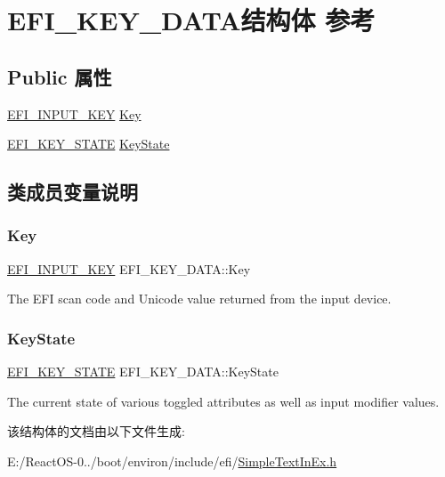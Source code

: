 \hypertarget{struct_e_f_i___k_e_y___d_a_t_a}{}\section{E\+F\+I\+\_\+\+K\+E\+Y\+\_\+\+D\+A\+T\+A结构体 参考}
\label{struct_e_f_i___k_e_y___d_a_t_a}
\subsection*{Public 属性}
\begin{DoxyCompactItemize}
\item 
\hyperlink{struct_e_f_i___i_n_p_u_t___k_e_y}{E\+F\+I\+\_\+\+I\+N\+P\+U\+T\+\_\+\+K\+EY} \hyperlink{struct_e_f_i___k_e_y___d_a_t_a_a820292c57a8737fe2cbae05d847d3657}{Key}
\item 
\hyperlink{struct___e_f_i___k_e_y___s_t_a_t_e}{E\+F\+I\+\_\+\+K\+E\+Y\+\_\+\+S\+T\+A\+TE} \hyperlink{struct_e_f_i___k_e_y___d_a_t_a_ad3c7e272c50ae718fa27bab09ec7b96f}{Key\+State}
\end{DoxyCompactItemize}


\subsection{类成员变量说明}
\mbox{\label{struct_e_f_i___k_e_y___d_a_t_a_a820292c57a8737fe2cbae05d847d3657}} 
\subsubsection{\texorpdfstring{Key}{Key}}
{\footnotesize\ttfamily \hyperlink{struct_e_f_i___i_n_p_u_t___k_e_y}{E\+F\+I\+\_\+\+I\+N\+P\+U\+T\+\_\+\+K\+EY} E\+F\+I\+\_\+\+K\+E\+Y\+\_\+\+D\+A\+T\+A\+::\+Key}

The E\+FI scan code and Unicode value returned from the input device. \mbox{\label{struct_e_f_i___k_e_y___d_a_t_a_ad3c7e272c50ae718fa27bab09ec7b96f}} 
\subsubsection{\texorpdfstring{Key\+State}{KeyState}}
{\footnotesize\ttfamily \hyperlink{struct___e_f_i___k_e_y___s_t_a_t_e}{E\+F\+I\+\_\+\+K\+E\+Y\+\_\+\+S\+T\+A\+TE} E\+F\+I\+\_\+\+K\+E\+Y\+\_\+\+D\+A\+T\+A\+::\+Key\+State}

The current state of various toggled attributes as well as input modifier values. 

该结构体的文档由以下文件生成\+:\begin{DoxyCompactItemize}
\item 
E\+:/\+React\+O\+S-\/0../boot/environ/include/efi/\hyperlink{_simple_text_in_ex_8h}{Simple\+Text\+In\+Ex.\+h}\end{DoxyCompactItemize}
